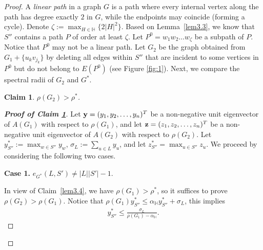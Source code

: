 \documentclass[11pt, a4paper]{article}
\newtheorem{claim}[theorem]{Claim}
\theoremstyle{definition}
\newcommand{\<}{\subseteq}
\begin{document}
\begin{proof}
A \textit{linear path} in a graph $G$ is a path where every internal vertex along the path has degree exactly $2$ in $G$, while the endpoints may  coincide (forming a cycle). 
Denote $\zeta:=\max_{H\in \mathbb{H}}\{2|H|^2\}$. Based on Lemma~\ref{lem3.3}, we know that $S''$ contains a path $P$ of  order at least $\zeta$. %
Let $P^0=w_1w_2\ldots w_{\zeta}$ be a subpath of $P$. 
Notice that $P^0$ may not be a linear path.
Let $G_2$ be the graph obtained from $G_1+\{u_kv_{j_k}\}$ by deleting all edges within $S''$ that are incident to some vertices in $P^0$ but do not belong to $E(P^0)$  (see Figure \ref{fig:1}). 
Next, we compare the spectral radii of $G_2$ and $G^*$. 

\begin{claim}\label{lem3.5}
 $\rho(G_2)>\rho^*$. 
\end{claim}
\begin{proof}[\bf Proof of Claim \ref{lem3.5}]
    Let ${\bf y}=(y_1,y_2,\ldots,y_n)^{T}$ be a non-negative unit eigenvector of 
$A(G_1)$ with respect to $\rho(G_1)$, and let ${\bf z}=(z_1,z_2,\ldots, z_n)^T$ be a non-negative unit eigenvector of $A(G_2)$ with respect to $\rho(G_2)$. Let %
    $y_{S''}^*:=\max_{w\in S''}y_w$,  $\sigma_L:=\sum_{u\in L}y_u$, and let $z_{S''}^*=\max_{u\in S''}z_u$. 
We proceed by  considering the following two cases.

{\bf Case 1.} $e_{G^*}(L,S')\neq |L||S'|-1$.
    
    In view of Claim~\ref{lem3.4}, we have $\rho(G_1)>\rho^*$, so it suffices to prove $\rho(G_2)>\rho(G_1)$. Notice that $\rho(G_1)y_{S''}^*\leq \alpha_{\mathbb{H}}y_{S''}^*+\sigma_L$, this implies 
    \begin{align}\label{ys}
        y_{S''}^*\leq \frac{\sigma_L}{\rho(G_1)-\alpha_{\mathbb{H}}}.
    \end{align}
  


\end{proof}
\end{proof}
\end{document}
